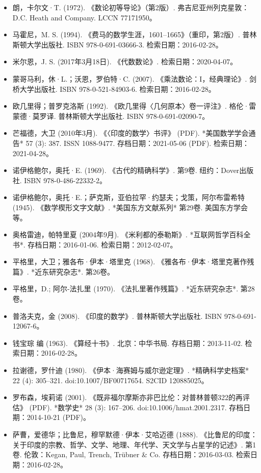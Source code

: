 \begin{itemize}
\item 朗，卡尔文·T. (1972). 《数论初等导论》（第2版）. 弗吉尼亚州列克星敦：D.C. Heath and Company. LCCN 77171950。
\item 马霍尼，M. S. (1994). 《费马的数学生涯，1601–1665》（重印，第2版）. 普林斯顿大学出版社. ISBN 978-0-691-03666-3. 检索日期：2016-02-28。
\item 米尔恩，J. S. (2017年3月18日). 《代数数论》. 检索日期：2020-04-07。
\item 蒙哥马利，休·L.；沃恩，罗伯特·C. (2007). 《乘法数论：I，经典理论》. 剑桥大学出版社. ISBN 978-0-521-84903-6. 检索日期：2016-02-28。
\item 欧几里得；普罗克洛斯 (1992). 《欧几里得〈几何原本〉卷一评注》. 格伦·雷蒙德·莫罗译. 普林斯顿大学出版社. ISBN 978-0-691-02090-7。
\item 芒福德，大卫 (2010年3月). 《〈印度的数学〉书评》 (PDF). *美国数学学会通告* 57 (3): 387. ISSN 1088-9477. 存档日期：2021-05-06 (PDF). 检索日期：2021-04-28。
\item 诺伊格鲍尔，奥托·E. (1969). 《古代的精确科学》. 第9卷. 纽约：Dover出版社. ISBN 978-0-486-22332-2。
\item 诺伊格鲍尔，奥托·E.；萨克斯，亚伯拉罕·约瑟夫；戈策，阿尔布雷希特 (1945). 《数学楔形文字文献》. *美国东方文献系列* 第29卷. 美国东方学会等。
\item 奥格雷迪，帕特里夏 (2004年9月). 《米利都的泰勒斯》. *互联网哲学百科全书*. 存档日期：2016-01-06. 检索日期：2012-02-07。
\item 平格里，大卫；雅各布·伊本·塔里克 (1968). 《雅各布·伊本·塔里克著作残篇》. *近东研究杂志*. 第26卷。
\item 平格里，D.; 阿尔-法扎里 (1970). 《法扎里著作残篇》. *近东研究杂志*. 第28卷。
\item 普洛夫克，金 (2008). 《印度的数学》. 普林斯顿大学出版社. ISBN 978-0-691-12067-6。
\item 钱宝琮 编 (1963). 《算经十书》. 北京：中华书局. 存档日期：2013-11-02. 检索日期：2016-02-28。
\item 拉谢德，罗什迪 (1980). 《伊本·海赛姆与威尔逊定理》. *精确科学史档案* 22 (4): 305–321. doi:10.1007/BF00717654. S2CID 120885025。
\item 罗布森，埃莉诺 (2001). 《既非福尔摩斯亦非巴比伦：对普林普顿322的再评估》 (PDF). *数学史* 28 (3): 167–206. doi:10.1006/hmat.2001.2317. 存档日期：2014-10-21 (PDF)。
\item 萨曹，爱德华；比鲁尼，穆罕默德·伊本·艾哈迈德 (1888). 《比鲁尼的印度：关于印度的宗教、哲学、文学、地理、年代学、天文学与占星学的记述》. 第1卷. 伦敦：Kegan, Paul, Trench, Trübner & Co. 存档日期：2016-03-03. 检索日期：2016-02-28。

\end{itemize}
